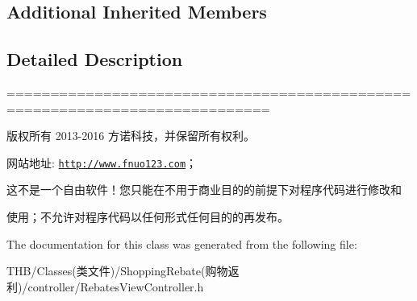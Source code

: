 \subsection*{Additional Inherited Members}


\subsection{Detailed Description}
============================================================================

版权所有 2013-\/2016 方诺科技，并保留所有权利。

网站地址\+: \href{http://www.fnuo123.com}{\tt http\+://www.\+fnuo123.\+com}； 



这不是一个自由软件！您只能在不用于商业目的的前提下对程序代码进行修改和

使用；不允许对程序代码以任何形式任何目的的再发布。 

 

The documentation for this class was generated from the following file\+:\begin{DoxyCompactItemize}
\item 
T\+H\+B/\+Classes(类文件)/\+Shopping\+Rebate(购物返利)/controller/Rebates\+View\+Controller.\+h\end{DoxyCompactItemize}
